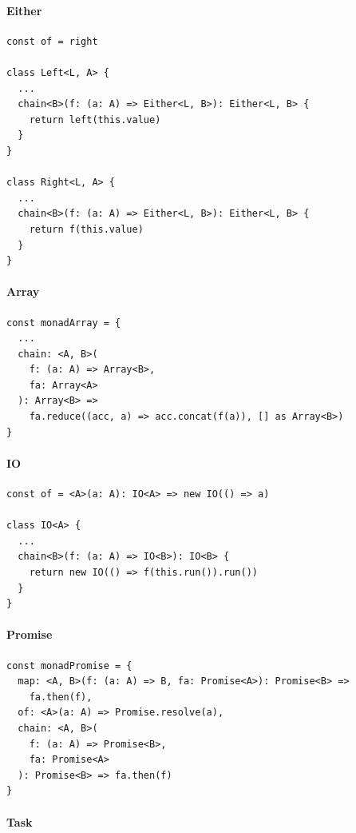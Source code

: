 \documentclass[12pt]{article}
\begin{document}
\paragraph{Either}

\begin{verbatim}
const of = right

class Left<L, A> {
  ...
  chain<B>(f: (a: A) => Either<L, B>): Either<L, B> {
    return left(this.value)
  }
}

class Right<L, A> {
  ...
  chain<B>(f: (a: A) => Either<L, B>): Either<L, B> {
    return f(this.value)
  }
}
\end{verbatim}

\paragraph{Array}

\begin{verbatim}
const monadArray = {
  ...
  chain: <A, B>(
    f: (a: A) => Array<B>,
    fa: Array<A>
  ): Array<B> =>
    fa.reduce((acc, a) => acc.concat(f(a)), [] as Array<B>)
}
\end{verbatim}

\paragraph{IO}

\begin{verbatim}
const of = <A>(a: A): IO<A> => new IO(() => a)

class IO<A> {
  ...
  chain<B>(f: (a: A) => IO<B>): IO<B> {
    return new IO(() => f(this.run()).run())
  }
}
\end{verbatim}

\paragraph{Promise}

\begin{verbatim}
const monadPromise = {
  map: <A, B>(f: (a: A) => B, fa: Promise<A>): Promise<B> =>
    fa.then(f),
  of: <A>(a: A) => Promise.resolve(a),
  chain: <A, B>(
    f: (a: A) => Promise<B>,
    fa: Promise<A>
  ): Promise<B> => fa.then(f)
}
\end{verbatim}

\paragraph{Task}
\end{document}

